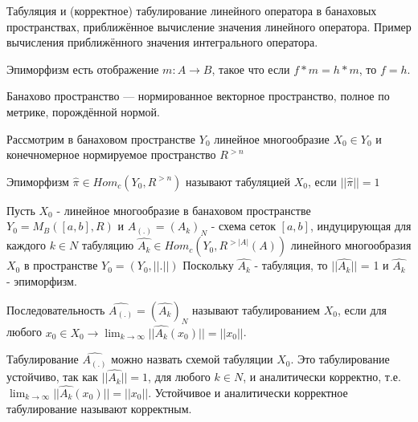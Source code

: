 \documentclass[__main__.tex]{subfiles}
\begin{document}
Табуляция и (корректное) табулирование линейного оператора в банаховых пространствах, приближённое вычисление значения линейного оператора. Пример вычисления приближённого значения интегрального оператора.

\begin{definition}
	Эпиморфизм есть отображение $m: A \rightarrow B$, такое что если $f*m = h*m$, то $f=h$. 
\end{definition}

\begin{definition}
	Банахово пространство — нормированное векторное пространство, полное по метрике, порождённой нормой.
\end{definition}
Рассмотрим в банаховом пространстве $Y_0$ линейное многообразие $X_0 \in Y_0$ и конечномерное нормируемое пространство $R^{> n}$
\begin{definition}
	Эпиморфизм $\hat{\pi} \in Hom_{c}(Y_0, R^{> n})$ называют табуляцией $X_0$, если $||\hat{\pi}||=1$
\end{definition}
Пусть $X_{0}$ - линейное многообразие в банаховом пространстве $Y_{0} = M_{B}([a,b],R)$ и $A_{(.)} = (A_{k})_{N}$ - схема сеток $[a,b]$, индуцирующая для каждого $k \in N$ табуляцию $\hat{A_{k}} \in Hom_{c}(Y_{0}, R^{>|A|}(A))$ линейного многообразия $X_{0}$ в пространстве $Y_{0} = (Y_{0},||.||)$ Поскольку 
 $\hat{A_{k}}$ - табуляция, то $|| \hat{A_{k}}||$ = 1 и  $\hat{A_{k}}$ - эпиморфизм.

\begin{definition}
	Последовательность $\hat{A_{(.)}} = (\hat{A_{k}})_{N}$ называют табулированием $X_{0}$, если для любого $x_0 \in X_0 \rightarrow \lim_{k \rightarrow \infty} ||\hat{A_{k}}(x_0)|| =||x_0||$.
\end{definition}

\begin{definition}
	Табулирование $\hat{A_{(.)}}$ можно назвать схемой табуляции $X_{0}$. Это табулирование устойчиво, так как $||\hat{A_{k}}|| = 1$, для любого $k \in N$, и аналитически корректно, т.е. $\lim_{k \rightarrow \infty} ||\hat{A_{k}}(x_0)|| =||x_0||$. Устойчивое и аналитически корректное табулирование называют корректным.
\end{definition}
\end{document}

